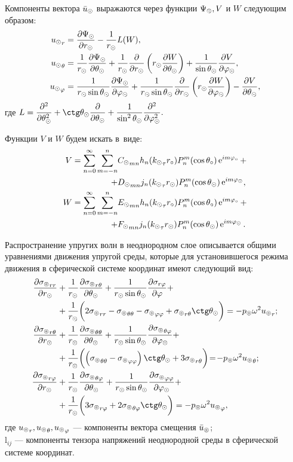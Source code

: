 Компоненты вектора $\bar{u}_\odot$ выражаются через функции $\Psi_\odot, V$ и $W$ следующим образом:
\begin{equation}\label{eq_us}
\begin{split}
{u_\odot}_r &= \frac{\partial \Psi_\odot}{\partial r_\odot} - \frac{1}{r_\odot}L(W),\\
{u_\odot}_\theta &= \frac{1}{r_\odot}\frac{\partial \Psi_\odot}{\partial \theta_\odot} + \frac{1}{r_\odot}\frac{\partial}{\partial r_\odot}\left(r_\odot\frac{\partial W}{\partial \theta_\odot}\right) + \frac{1}{\sin\theta_\odot}\frac{\partial V}{\partial\varphi_\odot},\\
{u_\odot}_\varphi &= \frac{1}{r_\odot \sin\theta_\odot}\frac{\partial \Psi_\odot}{\partial \varphi_\odot} + \frac{1}{r_\odot\sin\theta_\odot}\frac{\partial}{\partial r_\odot}\left(r_\odot\frac{\partial W}{\partial \varphi_\odot}\right) - \frac{\partial V}{\partial \theta_\odot},
\end{split}
\end{equation}
где $L = \df{\de^2}{\de\Q\s^2} + \ctg\Q\s\df{\de}{\de\Q\s} + \df{1}{\sin^2\Q\s}\df{\de^2}{\de\f\s^2}.$

Функции $V$ и $W$ будем искать в~виде:
\begin{align}
V = \sum\limits_{n=0}^\infty \sum\limits_{m=-n}^n &{C_\odot}_{mn} h_n({k_\odot}_\tau r_\circ)P_n^m(\cos\theta_\circ)\operatorname{e}^{im\varphi_\circ} + \notag\\
+ &{D_\odot}_{mn} j_n({k_\odot}_\tau r_\odot)P_n^m(\cos\theta_\odot)\operatorname{e}^{im\varphi_\odot},\label{eq_v}\\
W = \sum\limits_{n=0}^\infty \sum\limits_{m=-n}^n &{E_\odot}_{mn} h_n({k_\odot}_\tau r_\circ)P_n^m(\cos\theta_\circ)\operatorname{e}^{im\varphi_\circ} + \notag\\
+ &{F_\odot}_{mn} j_n({k_\odot}_\tau r_\odot)P_n^m(\cos\theta_\odot)\operatorname{e}^{im\varphi_\odot}.\label{eq_w}
\end{align}

Распространение упругих волн в неоднородном слое описывается общими уравнениями движения упругой среды, которые для установившегося режима движения в сферической системе координат имеют следующий вид:
\begin{equation}\label{eq_moving}
\begin{split}
\fr{\de{\si\l}_{rr}}{\de r\s} &+ \fr1{r\s} \fr{\de{\si\l}_{r\Q}}{\de\Q\s} + \fr{1}{r\s\sin\Q\s}\fr{\de\si_{r\f}}{\de\f} +\\
&+ \fr1{r\s}\biggl(2{\si\l}_{rr}-{\si\l}_{\Q\Q}-{\si\l}_{\f\f}+{\si\l}_{r\Q}\ctg\Q\s\biggr)=-p\l\om^2{u\l}_r;\\
\fr{\de{\si\l}_{r\Q}}{\de r\s} &+ \fr1{r\s} \fr{\de{\si\l}_{\Q\Q}}{\de\Q\s} + \fr{1}{r\s\sin\Q\s}\fr{\de{\si\l}_{\Q\f}}{\de\f\s} +\\
&+ \fr1{r\s}\biggl(\left({\si\l}_{\Q\Q}-{\si\l}_{\f\f}\right)\ctg\Q\s+3{\si\l}_{r\Q}\biggr)\!=\!-p\l\om^2{u\l}_\Q;\\
\fr{\de{\si\l}_{r\f}}{\de r\s} &+ \fr1{r\s} \fr{\de{\si\l}_{\Q\f}}{\de\Q\s} + \fr{1}{r\s\sin\Q\s}\fr{\de{\si\l}_{\f\f}}{\de\f\s} +\\
&+ \fr1{r\s}\biggl(3{\si\l}_{r\f}+2{\si\l}_{\Q\f}\ctg\Q\s\biggr)=-p\l\om^2{u\l}_\f,
\end{split}
\end{equation}
где ${u_\circledcirc}_r, {u_\circledcirc}_\theta, {u_\circledcirc}_\varphi$ --- компоненты вектора смещения $\bar{u}_\circledcirc$;\\
${\si\l}_{ij}$ --- компоненты тензора напряжений неоднородной среды в сферической системе координат.

